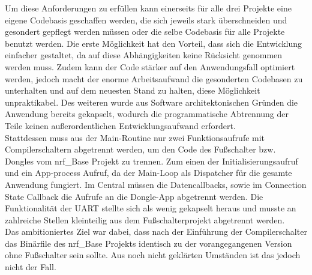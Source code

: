 Um diese Anforderungen zu erfüllen kann einerseits für alle drei Projekte eine eigene Codebasis geschaffen werden, die sich jeweils stark überschneiden und gesondert gepflegt werden müssen oder die selbe Codebasis für alle Projekte benutzt werden. Die erste Möglichkeit hat den Vorteil, dass sich die Entwicklung einfacher gestaltet, da auf diese Abhängigkeiten keine Rücksicht genommen werden muss. Zudem kann der Code stärker auf den Anwendungsfall optimiert werden, jedoch macht der enorme Arbeitsaufwand die gesonderten Codebasen zu unterhalten und auf dem neuesten Stand zu halten, diese Möglichkeit unpraktikabel. Des weiteren wurde aus Software architektonischen Gründen die Anwendung bereits gekapselt, wodurch die programmatische Abtrennung der Teile keinen außerordentlichen Entwicklungsaufwand erfordert.\\
Stattdessen muss aus der Main-Routine nur zwei Funktionsaufrufe mit Compilerschaltern abgetrennt werden, um den Code des Fußschalter bzw. Dongles vom nrf\_Base Projekt zu trennen. Zum einen der Initialisierungsaufruf und ein App-process Aufruf, da der Main-Loop als Dispatcher für die gesamte Anwendung fungiert. Im Central müssen die Datencallbacks, sowie im Connection State Callback die Aufrufe an die Dongle-App abgetrennt werden. Die Funktionalität der UART stellte sich als wenig gekapselt heraus und musste an zahlreiche Stellen kleinteilig aus dem Fußschalterprojekt abgetrennt werden.\\ 
Das ambitioniertes Ziel war dabei, dass nach der Einführung der Compilerschalter das Binärfile des nrf\_Base Projekts identisch zu der vorangegangenen Version ohne Fußschalter sein sollte. Aus noch nicht geklärten Umständen ist das jedoch nicht der Fall.



